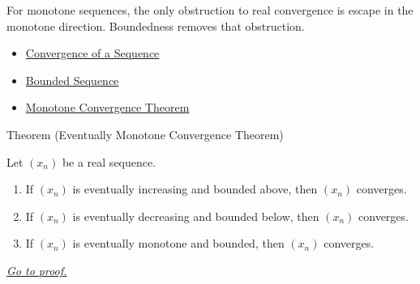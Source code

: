 \begin{remark*}[Interpretation]
For monotone sequences, the only obstruction to real convergence is escape in
the monotone direction. Boundedness removes that obstruction.
\end{remark*}

\begin{dependencies}
\begin{itemize}
  \item \hyperref[def:convergent-sequence]{Convergence of a Sequence}
  \item \hyperref[def:bounded-sequence]{Bounded Sequence}
  \item \hyperref[thm:monotone-convergence-theorem]{Monotone Convergence Theorem}
\end{itemize}
\end{dependencies}


\begin{theorembox}{Theorem (Eventually Monotone Convergence Theorem)}
\begin{theorem}
\label{thm:eventually-monotone-convergence-theorem}
Let $(x_n)$ be a real sequence.
\begin{enumerate}[label=(\alph*)]
  \item If $(x_n)$ is eventually increasing and bounded above, then
  $(x_n)$ converges.
  \item If $(x_n)$ is eventually decreasing and bounded below, then
  $(x_n)$ converges.
  \item If $(x_n)$ is eventually monotone and bounded, then $(x_n)$ converges.
\end{enumerate}

\smallskip
\noindent
\hyperref[prf:eventually-monotone-convergence-theorem]{\textit{Go to proof.}}
\end{theorem}
\end{theorembox}

